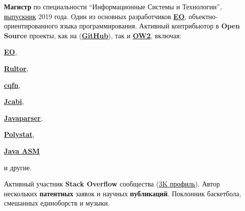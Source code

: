 \documentclass{vl}
\begin{document}
    \textbf{Магистр} по специальности ``Информационные Системы и Технологии'',
    \href{https://en.wikipedia.org/wiki/Saint_Petersburg_Electrotechnical_University}{выпускник} 2019 года.
    Один из основных разработчиков \textbf{\href{https://www.eolang.org}{EO}}, объектно-ориентированного языка
    программирования.\newline
    Активный контрибьютор в \textbf{Open Source} проекты, как
    на (\textbf{\href{https://github.com/volodya-lombrozo}{GitHub}}),
    так и \textbf{\href{https://gitlab.ow2.org/lombrozo}{OW2}}, включая:
    \begin{inparaenum}[1)]
        \item \textbf{\href{https://www.eolang.org}{EO}},
        \item \textbf{\href{https://github.com/yegor256/rultor}{Rultor}},
        \item \textbf{\href{https://github.com/cqfn}{cqfn}},
        \item \textbf{\href{https://github.com/jcabi}{Jcabi}},
        \item \textbf{\href{https://github.com/javaparser/javaparser}{Javaparser}},
        \item \textbf{\href{https://github.com/polystat}{Polystat}},
        \item \textbf{\href{https://gitlab.ow2.org/asm/asm}{Java ASM}}
        \item и другие.
    \end{inparaenum}
    Активный участник \textbf{Stack Overflow} сообщества
    (\href{https://stackoverflow.com/users/10423604/volodya-lombrozo}{3K профиль}).\newline
    Автор нескольких \textbf{патентных} заявок и научных \textbf{публикаций}.\newline
    Поклонник баскетбола, смешанных единоборств и музыки.
\end{document}
